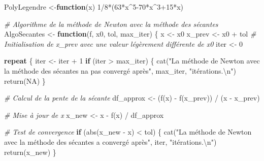 \documentclass[
]{article}
\newenvironment{Shaded}{\begin{snugshade}}{\end{snugshade}}
\newcommand{\CommentTok}[1]{\textcolor[rgb]{0.56,0.35,0.01}{\textit{#1}}}
\newcommand{\ConstantTok}[1]{\textcolor[rgb]{0.00,0.00,0.00}{#1}}
\newcommand{\ControlFlowTok}[1]{\textcolor[rgb]{0.13,0.29,0.53}{\textbf{#1}}}
\newcommand{\DecValTok}[1]{\textcolor[rgb]{0.00,0.00,0.81}{#1}}
\newcommand{\FunctionTok}[1]{\textcolor[rgb]{0.00,0.00,0.00}{#1}}
\newcommand{\NormalTok}[1]{#1}
\newcommand{\OtherTok}[1]{\textcolor[rgb]{0.56,0.35,0.01}{#1}}
\newcommand{\SpecialCharTok}[1]{\textcolor[rgb]{0.00,0.00,0.00}{#1}}
\newcommand{\StringTok}[1]{\textcolor[rgb]{0.31,0.60,0.02}{#1}}
\begin{document}
\begin{Shaded}
\begin{Highlighting}[]
\NormalTok{PolyLegendre }\OtherTok{\textless{}{-}}\ControlFlowTok{function}\NormalTok{(x) }\DecValTok{1}\SpecialCharTok{/}\DecValTok{8}\SpecialCharTok{*}\NormalTok{(}\DecValTok{63}\SpecialCharTok{*}\NormalTok{x}\SpecialCharTok{\^{}}\DecValTok{5{-}70}\SpecialCharTok{*}\NormalTok{x}\SpecialCharTok{\^{}}\DecValTok{3}\SpecialCharTok{+}\DecValTok{15}\SpecialCharTok{*}\NormalTok{x)}

\CommentTok{\# Algorithme de la méthode de Newton avec la méthode des sécantes}
\NormalTok{AlgoSecantes }\OtherTok{\textless{}{-}} \ControlFlowTok{function}\NormalTok{(f, x0, tol, max\_iter) \{}
\NormalTok{  x }\OtherTok{\textless{}{-}}\NormalTok{ x0}
\NormalTok{  x\_prev }\OtherTok{\textless{}{-}}\NormalTok{ x0 }\SpecialCharTok{+}\NormalTok{ tol  }\CommentTok{\# Initialisation de x\_prev avec une valeur légèrement différente de x0}
\NormalTok{  iter }\OtherTok{\textless{}{-}} \DecValTok{0}
  
  \ControlFlowTok{repeat}\NormalTok{ \{}
\NormalTok{    iter }\OtherTok{\textless{}{-}}\NormalTok{ iter }\SpecialCharTok{+} \DecValTok{1}
    \ControlFlowTok{if}\NormalTok{ (iter }\SpecialCharTok{\textgreater{}}\NormalTok{ max\_iter) \{}
      \FunctionTok{cat}\NormalTok{(}\StringTok{"La méthode de Newton avec la méthode des sécantes n\textquotesingle{}a pas convergé après"}\NormalTok{, max\_iter, }\StringTok{"itérations.}\SpecialCharTok{\textbackslash{}n}\StringTok{"}\NormalTok{)}
      \FunctionTok{return}\NormalTok{(}\ConstantTok{NA}\NormalTok{)}
\NormalTok{    \}}
    
    \CommentTok{\# Calcul de la pente de la sécante}
\NormalTok{    df\_approx }\OtherTok{\textless{}{-}}\NormalTok{ (}\FunctionTok{f}\NormalTok{(x) }\SpecialCharTok{{-}} \FunctionTok{f}\NormalTok{(x\_prev)) }\SpecialCharTok{/}\NormalTok{ (x }\SpecialCharTok{{-}}\NormalTok{ x\_prev)}
    
    \CommentTok{\# Mise à jour de x}
\NormalTok{    x\_new }\OtherTok{\textless{}{-}}\NormalTok{ x }\SpecialCharTok{{-}} \FunctionTok{f}\NormalTok{(x) }\SpecialCharTok{/}\NormalTok{ df\_approx}
    
    \CommentTok{\# Test de convergence}
    \ControlFlowTok{if}\NormalTok{ (}\FunctionTok{abs}\NormalTok{(x\_new }\SpecialCharTok{{-}}\NormalTok{ x) }\SpecialCharTok{\textless{}}\NormalTok{ tol) \{}
      \FunctionTok{cat}\NormalTok{(}\StringTok{"La méthode de Newton avec la méthode des sécantes a convergé après"}\NormalTok{, iter, }\StringTok{"itérations.}\SpecialCharTok{\textbackslash{}n}\StringTok{"}\NormalTok{)}
      \FunctionTok{return}\NormalTok{(x\_new)}
\NormalTok{    \}}
    

\end{Highlighting}
\end{Shaded}
\end{document}
